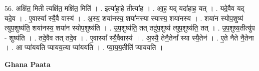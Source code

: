 \documentclass[17pt]{extarticle}
\begin{document}
56. अक्षि॑त॒ मिती त्यक्षि॑त॒ मक्षि॑त॒ मिति॑ । . इत्या॑हा॒हे तीत्या॑ह । . आ॒ह॒ यद् यदा॑हाह॒ यत् । . यदे॒वैव यद् यदे॒व । . ए॒वास्या᳚ स्यै॒वै वास्य॑ । . अ॒स्य॒ शया॑नस्य॒ शया॑नस्या स्यास्य॒ शया॑नस्य । . शया॑न स्योप॒शुष्य॑ त्युप॒शुष्य॑ति॒ शया॑नस्य॒ शया॑न स्योप॒शुष्य॑ति । . उ॒प॒शुष्य॑ति॒ तत् तदु॑प॒शुष्य॑ त्युप॒शुष्य॑ति॒ तत् । . उ॒प॒शुष्य॒तीत्यु॑प - शुष्य॑ति । . तदे॒वैव तत् तदे॒व । . ए॒वास्या᳚ स्यै॒वैवास्य॑ । . अ॒स्यै॒ तेनै॒तेना᳚ स्या स्यै॒तेन॑ । . ए॒ते नैते नै॒तेना । . आ प्या॑ययति प्यायय॒त्या प्या॑ययति । . प्या॒य॒य॒तीति॑ प्याययति । \newline

\textbf{Ghana Paata } \newline
\end{document}
